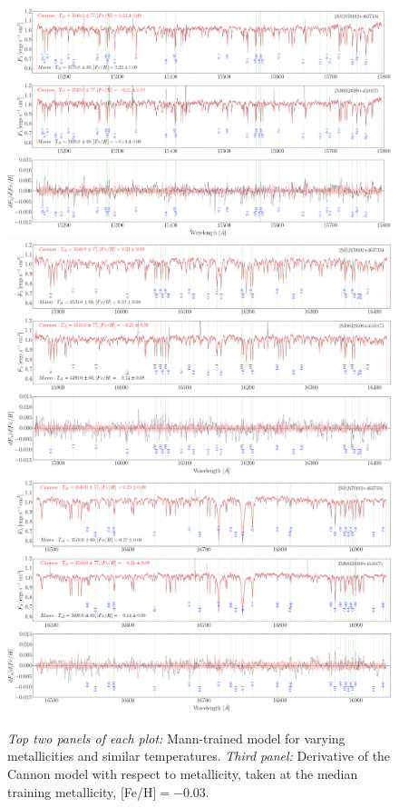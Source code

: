 \documentclass[modern]{aastex62}
\begin{document}
\begin{figure}[ht]
\begin{center}
\includegraphics[width=16cm]{figures/demo_derivatives_feh1.png}
\includegraphics[width=16cm]{figures/demo_derivatives_feh2.png}
\includegraphics[width=16cm]{figures/demo_derivatives_feh3.png}
\end{center}
\caption{\textit{Top two panels of each plot:} Mann-trained model for varying metallicities and similar temperatures. \textit{Third panel:} Derivative of the Cannon model with respect to metallicity, taken at the median training metallicity, [Fe/H]$=-0.03$.} \label{fig:demo_feh}
\end{figure}
\end{document}
